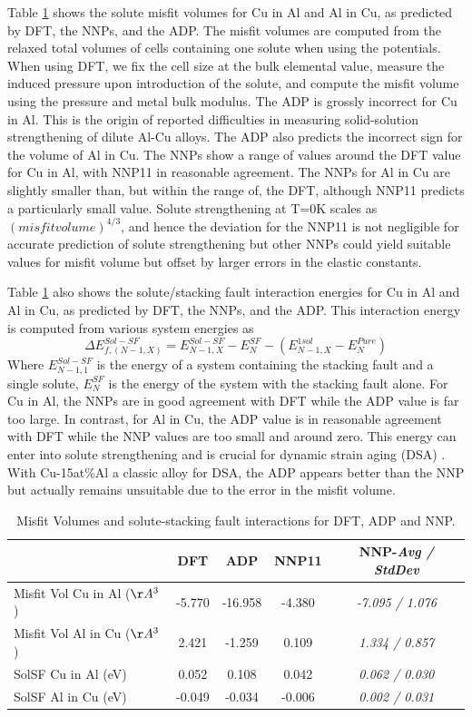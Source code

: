 \documentclass{article}
\begin{document}
Table \ref{table:solute_misfit_SF} shows the solute misfit volumes for Cu in Al and Al in Cu, as predicted by DFT, the NNPs, and the ADP.  The misfit volumes are computed from the relaxed total volumes of cells containing one solute when using the potentials.  When using DFT, we fix the cell size at the bulk elemental value, measure the induced pressure upon introduction of the solute, and compute the misfit volume using the pressure and metal bulk modulus.  The ADP is grossly incorrect for Cu in Al.  This is the origin of reported difficulties in measuring solid-solution strengthening of dilute Al-Cu alloys\cite{Singh2013AnAlloy}.   The ADP also predicts the incorrect sign for the volume of Al in Cu.  The NNPs show a range of values around the DFT value for Cu in Al, with NNP11 in reasonable agreement.  The NNPs for Al in Cu are slightly smaller than, but within the range of, the DFT, although NNP11 predicts a particularly small value.  Solute strengthening at T=0K scales as $(misfit volume)^{4/3}$, and hence the deviation for the NNP11 is not negligible for accurate prediction of solute strengthening but other NNPs could yield suitable values for misfit volume but offset by larger errors in the elastic constants.

Table \ref{table:solute_misfit_SF} also shows the solute/stacking fault interaction energies for Cu in Al and Al in Cu, as predicted by DFT, the NNPs, and the ADP.
This interaction energy is computed from various system energies as
\begin{equation}
\Delta E^{Sol-SF}_{f,(N-1,X)} = E^{Sol-SF}_{N-1,X} - E^{SF}_{N} - (E^{1sol}_{N-1,X}-E^{Pure}_{N})
\end{equation}
Where $E^{Sol-SF}_{N-1,1}$ is the energy of a system containing the stacking fault and a single solute,
$E^{SF}_{N}$ is the energy of the system with the stacking fault alone. 
For Cu in Al, the NNPs are in good agreement with DFT while the ADP value is far too large.  In contrast, for Al in Cu, the ADP value
is in reasonable agreement with DFT while the NNP values are too small and around zero.  This energy can enter into solute strengthening\cite{Leyson2010} and is crucial for dynamic strain aging (DSA) \cite{Curtin2006}.  With Cu-15at\%Al a classic alloy for DSA, the ADP appears better than the NNP but actually remains unsuitable due to the error in the misfit volume.

\begin{table}[H]
\begin{tabular}{l|cccc}%
\hline%
&DFT&ADP&NNP11& NNP-\emph{Avg / StdDev}\\%
\hline%
Misfit Vol Cu in Al ($\AA^3$)&{-}5.770&{-}16.958&{-}4.380&\emph{-7.095 / 1.076}\\%
Misfit Vol Al in Cu ($\AA^3$)&2.421&{-}1.259&0.109&\emph{1.334 / 0.857}\\%
SolSF Cu in Al (eV)&0.052&0.108&0.042&\emph{0.062 / 0.030}\\%
SolSF Al in Cu (eV)&{-}0.049&{-}0.034&{-}0.006&\emph{0.002 / 0.031}\\%
\hline%
\end{tabular}%
\caption{Misfit Volumes and solute-stacking fault interactions for DFT, ADP and NNP.}
\label{table:solute_misfit_SF}
\end{table}
\end{document}
